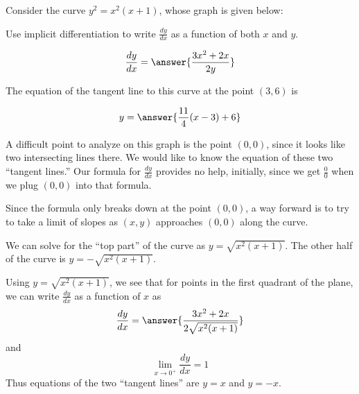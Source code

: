 \documentclass{ximera}
\author{Steven Gubkin}
\begin{document}
\begin{exercise}


Consider the curve  $y^2 = x^2(x+1)$, whose graph is given below:

\begin{image}
\end{image}

Use implicit differentiation to write $\frac{dy}{dx}$ as a function of both $x$ and $y$.

\[
\frac{dy}{dx} = \answer{\frac{3x^2+2x}{2y}}
\]

The equation of the tangent line to this curve at the point $(3,6)$ is

\[
y = \answer{\frac{11}{4}(x-3)+6}
\]

A difficult point to analyze on this graph is the point $(0,0)$, since
it looks like two intersecting lines there.  We would like to know the
equation of these two ``tangent lines.''  Our formula for
$\frac{dy}{dx}$ provides no help, initially, since we get
$\frac{0}{0}$ when we plug $(0,0)$ into that formula.

Since the formula only breaks down at the point $(0,0)$, a way forward
is to try to take a limit of slopes as $(x,y)$ approaches $(0,0)$
along the curve.

We can solve for the ``top part'' of the curve as $y =
\sqrt{x^2(x+1)}$.  The other half of the curve is $y =
-\sqrt{x^2(x+1)}$.

Using $y = \sqrt{x^2(x+1)}$, we see that for points in the first
quadrant of the plane, we can write $\frac{dy}{dx}$ as a function of
$x$ as
\[
\frac{dy}{dx} = \answer{\frac{3x^2+2x}{2\sqrt{x^2(x+1)}}}
\]
and
\[
\lim_{x \to 0^+} \frac{dy}{dx} = 1
\]
Thus equations of the two ``tangent lines'' are $y=x$ and $y=-x$.


\end{exercise}
\end{document}
